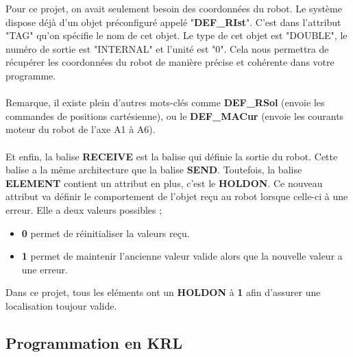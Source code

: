 Pour ce projet, on avait seulement besoin des coordonnées du robot. Le système dispose déjà d'un objet préconfiguré appelé "\textbf{DEF\_RIst}".
C'est dans l'attribut "TAG" qu'on spécifie le nom de cet objet.
Le type de cet objet est "DOUBLE", le numéro de sortie est "INTERNAL" et l'unité est "0".
Cela nous permettra de récupérer les coordonnées du robot de manière précise et cohérente dans votre programme.
\\
\\
Remarque, il existe plein d'autres mots-clés comme \textbf{DEF\_RSol} (envoie les commandes de positions cartésienne), ou le \textbf{DEF\_MACur} (envoie les courants moteur du robot de l'axe A1 à A6).
\\
\\
Et enfin, la balise \textbf{RECEIVE} est la balise qui définie la sortie du robot.
Cette balise a la même architecture que la balise \textbf{SEND}.
Toutefois, la balise \textbf{ELEMENT} contient un attribut en plus, c'est le \textbf{HOLDON}.
Ce nouveau attribut va définir le comportement de l'objet reçu au robot lorsque celle-ci à une erreur.
Elle a deux valeurs possibles ;
\begin{itemize}
    \item \textbf{0} permet de réinitialiser la valeurs reçu.
    \item \textbf{1} permet de maintenir l'ancienne valeur valide alors que la nouvelle valeur a une erreur.
\end{itemize}
Dans ce projet, tous les eléments ont un \textbf{HOLDON} à \textbf{1} afin d'assurer une localisation toujour valide.

\subsection{Programmation en KRL}

